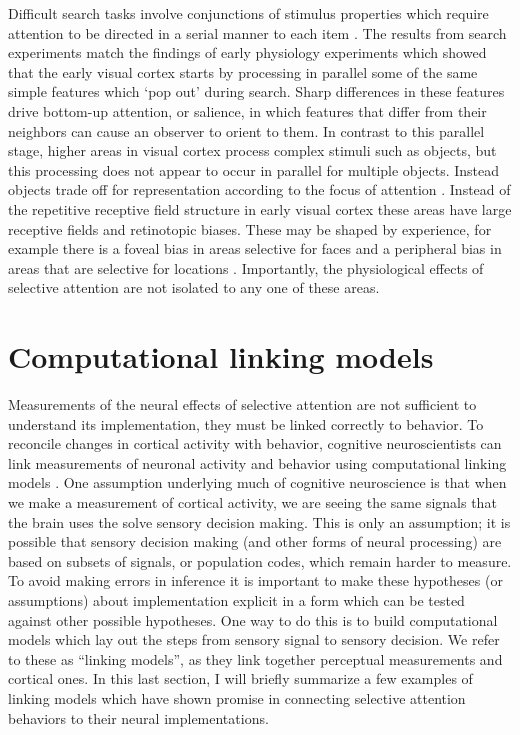 Difficult search tasks involve conjunctions of stimulus properties \citep{Egeth1984-ch} which require attention to be directed in a serial manner to each item \citep{Treisman1980-gu}. The results from search experiments match the findings of early physiology experiments \citep{Hubel1959-fo,Hubel1968-na} which showed that the early visual cortex starts by processing in parallel some of the same simple features which `pop out' during search. Sharp differences in these features drive bottom-up attention, or salience, in which features that differ from their neighbors can cause an observer to orient to them. In contrast to this parallel stage, higher areas in visual cortex process complex stimuli such as objects, but this processing does not appear to occur in parallel for multiple objects. Instead objects trade off for representation according to the focus of attention \citep{Desimone1998-wf}. Instead of the repetitive receptive field structure in early visual cortex these areas have large receptive fields and retinotopic biases. These may be shaped by experience, for example there is a foveal bias in areas selective for faces and a peripheral bias in areas that are selective for locations \citep{Levy2001-oe}. Importantly, the physiological effects of selective attention are not isolated to any one of these areas. 

\section{Computational linking models}

Measurements of the neural effects of selective attention are not sufficient to understand its implementation, they must be linked correctly to behavior. To reconcile changes in cortical activity with behavior, cognitive neuroscientists can link measurements of neuronal activity and behavior using computational linking models \citep{Barlow1972-kz,Brindley1960-gq,Cohen2010-xs,Newsome1989-fr,Pestilli2011-gi,Cook2002-zs}. One assumption underlying much of cognitive neuroscience is that when we make a measurement of cortical activity, we are seeing the same signals that the brain uses the solve sensory decision making. This is only an assumption; it is possible that sensory decision making (and other forms of neural processing) are based on subsets of signals, or population codes, which remain harder to measure. To avoid making errors in inference it is important to make these hypotheses (or assumptions) about implementation explicit in a form which can be tested against other possible hypotheses. One way to do this is to build computational models which lay out the steps from sensory signal to sensory decision. We refer to these as ``linking models'', as they link together perceptual measurements and cortical ones. In this last section, I will briefly summarize a few examples of linking models which have shown promise in connecting selective attention behaviors to their neural implementations. 

